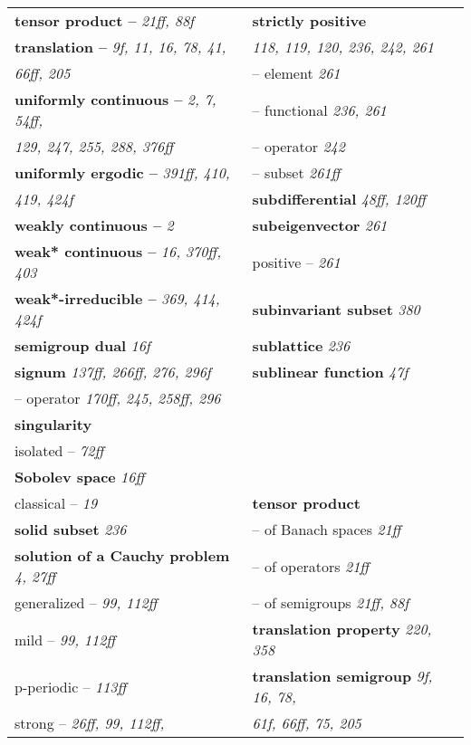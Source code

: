 \begin{longtable}{p{}p{}}
\textbf{tensor product --} \textit{21ff, 88f} & \textbf{strictly positive} \\
\textbf{translation --} \textit{9f, 11, 16, 78, 41,} & \quad \textit{118, 119, 120, 236, 242, 261} \\
\quad \textit{66ff, 205} & \quad -- element \textit{261} \\
\textbf{uniformly continuous --} \textit{2, 7, 54ff,} & \quad -- functional \textit{236, 261} \\
\quad \textit{129, 247, 255, 288, 376ff} & \quad -- operator \textit{242} \\
\textbf{uniformly ergodic --} \textit{391ff, 410,} & \quad -- subset \textit{261ff} \\
\quad \textit{419, 424f} & \textbf{subdifferential} \textit{48ff, 120ff} \\
\textbf{weakly continuous --} \textit{2} & \textbf{subeigenvector} \textit{261} \\
\textbf{weak* continuous --} \textit{16, 370ff, 403} & \quad positive -- \textit{261} \\
\textbf{weak*-irreducible --} \textit{369, 414, 424f} & \textbf{subinvariant subset} \textit{380} \\
\textbf{semigroup dual} \textit{16f} & \textbf{sublattice} \textit{236} \\
\textbf{signum} \textit{137ff, 266ff, 276, 296f} & \textbf{sublinear function} \textit{47f} \\
\quad -- operator \textit{170ff, 245, 258ff, 296} & \\
\textbf{singularity} & \\
\quad isolated -- \textit{72ff} & \\
\textbf{Sobolev space} \textit{16ff} & \\
\quad classical -- \textit{19} & \textbf{tensor product} \\
\textbf{solid subset} \textit{236} & \quad -- of Banach spaces \textit{21ff} \\
\textbf{solution of a Cauchy problem} \textit{4, 27ff} & \quad -- of operators \textit{21ff} \\
\quad generalized -- \textit{99, 112ff} & \quad -- of semigroups \textit{21ff, 88f} \\
\quad mild -- \textit{99, 112ff} & \textbf{translation property} \textit{220, 358} \\
\quad p-periodic -- \textit{113ff} & \textbf{translation semigroup} \textit{9f, 16, 78,} \\
\quad strong -- \textit{26ff, 99, 112ff,} & \quad \textit{61f, 66ff, 75, 205} \\

\end{longtable}
